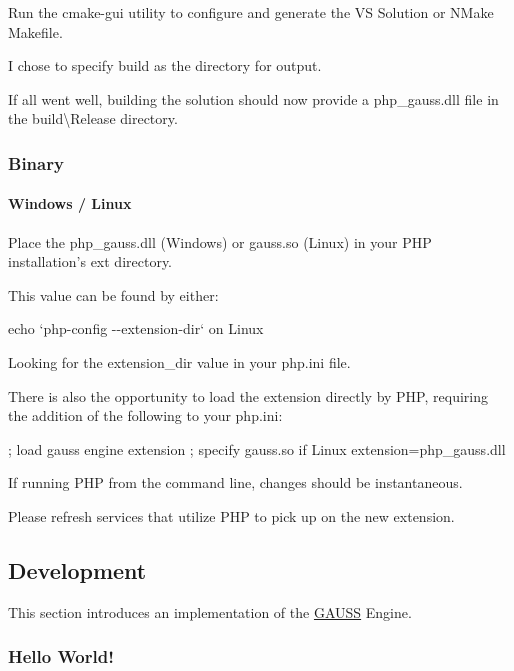 Run the {\ttfamily cmake-\/gui} utility to configure and generate the V\-S Solution or N\-Make Makefile.

I chose to specify {\ttfamily build} as the directory for output.

If all went well, building the solution should now provide a {\ttfamily php\-\_\-gauss.\-dll} file in the {\ttfamily build\textbackslash{}Release} directory.

\subsubsection*{Binary}

\paragraph*{Windows / Linux}

Place the {\ttfamily php\-\_\-gauss.\-dll} (Windows) or {\ttfamily gauss.\-so} (Linux) in your P\-H\-P installation's {\ttfamily ext} directory.

This value can be found by either\-:


\begin{DoxyEnumerate}
\item {\ttfamily echo `php-\/config -\/-\/extension-\/dir`} on Linux
\item Looking for the {\ttfamily extension\-\_\-dir} value in your {\ttfamily php.\-ini} file.
\end{DoxyEnumerate}

There is also the opportunity to load the extension directly by P\-H\-P, requiring the addition of the following to your {\ttfamily php.\-ini}\-: \begin{DoxyVerb}; load gauss engine extension
; specify gauss.so if Linux
extension=php_gauss.dll
\end{DoxyVerb}


If running P\-H\-P from the command line, changes should be instantaneous.

Please refresh services that utilize P\-H\-P to pick up on the new extension.

\subsection*{Development}

This section introduces an implementation of the \hyperlink{class_g_a_u_s_s}{G\-A\-U\-S\-S} Engine.

\subsubsection*{Hello World!}

